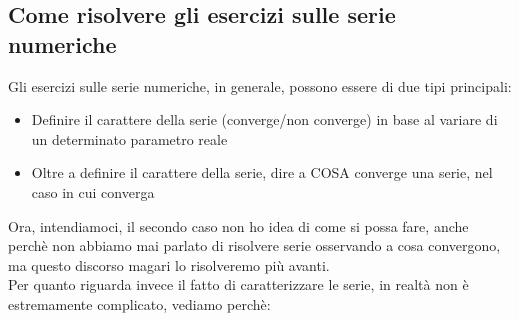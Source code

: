 \documentclass{article}
\theoremstyle{definition}
\begin{document}
\subsection{Come risolvere gli esercizi sulle serie numeriche}
Gli esercizi sulle serie numeriche, in generale, possono essere di due tipi principali:
\begin{itemize}
    \item Definire il carattere della serie (converge/non converge) in base al variare di un determinato parametro reale
    \item Oltre a definire il carattere della serie, dire a COSA converge una serie, nel caso in cui converga
\end{itemize}
Ora, intendiamoci, il secondo caso non ho idea di come si possa fare, anche perchè non abbiamo mai parlato di risolvere serie osservando a cosa convergono, ma questo discorso magari lo risolveremo più avanti.
\\
Per quanto riguarda invece il fatto di caratterizzare le serie, in realtà non è estremamente complicato, vediamo perchè:
\\
\end{document}
